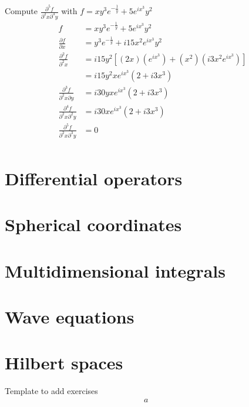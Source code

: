   Compute $\frac{\partial^5f}{\partial^2x\partial^3y}$ with $f = xy^3e^{-\frac{1}{y}} + 5e^{ix^3}y^2$
  \begin{align*}
    f & = xy^3e^{-\frac{1}{y}} + 5e^{ix^3}y^2 \\
    \frac{\partial f}{\partial x} & = y^3e^{-\frac{1}{y}} + i15x^2e^{ix^3}y^2\\
    \frac{\partial^2f}{\partial^2x} & = i15y^2[(2x)(e^{ix^3}) + (x^2)(i3x^2e^{ix^3})]\\
    & = i15y^2xe^{ix^3}(2 + i3x^3)\\
    \frac{\partial^3f}{\partial^2x\partial y} & = i30yxe^{ix^3}(2 + i3x^3) \\
    \frac{\partial^4f}{\partial^2x\partial^2y} & = i30xe^{ix^3}(2 + i3x^3) \\
    \frac{\partial^5f}{\partial^2x\partial^3y} & = 0 \\
  \end{align*}


\section{Differential operators}

\section{Spherical coordinates}

\section{Multidimensional integrals}

\section{Wave equations}

\section{Hilbert spaces}

  Template to add exercises
  \begin{align*}
    a &
      & \\
  \end{align*}